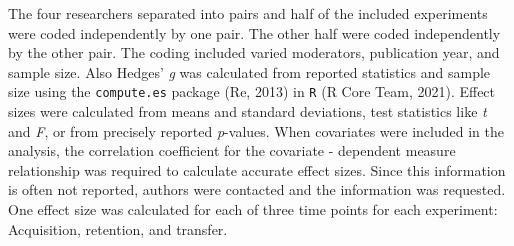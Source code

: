 \documentclass[
  english,
  man, donotrepeattitle,floatsintext]{apa7}
\begin{document}
The four researchers separated into pairs and half of the included experiments were coded independently by one pair. The other half were coded independently by the other pair. The coding included varied moderators, publication year, and sample size. Also Hedges' \emph{g} was calculated from reported statistics and sample size using the \texttt{compute.es} package (Re, 2013) in \texttt{R} (R Core Team, 2021). Effect sizes were calculated from means and standard deviations, test statistics like \emph{t} and \emph{F}, or from precisely reported \emph{p}-values. When covariates were included in the analysis, the correlation coefficient for the covariate - dependent measure relationship was required to calculate accurate effect sizes. Since this information is often not reported, authors were contacted and the information was requested. One effect size was calculated for each of three time points for each experiment: Acquisition, retention, and transfer.

\begingroup\fontsize{10}{12}\selectfont
\end{document}
